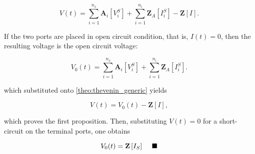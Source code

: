 \begin{equation} V(t) = \sum_{i=1}^{n_v} \mathbf{A}_i \left[V^S_i\right] + \sum_{i=1}^{n_i} \mathbf{Z}_A \left[I^S_i\right] - \mathbf{Z} \left[I\right] .\label{theo:thevenin_generic}\end{equation}

	If the two ports are placed in open circuit condition, that is, $I(t) = 0$, then the resulting voltage is the open circuit voltage:

\begin{equation} V_0(t) = \sum_{i=1}^{n_v} \mathbf{A}_i \left[V^S_i\right] + \sum_{i=1}^{n_i} \mathbf{Z}_A \left[I^S_i\right].\end{equation}

	\noindent which substituted onto \eqref{theo:thevenin_generic} yields

\begin{equation} V(t) = V_0(t) - \mathbf{Z} \left[I\right] ,\end{equation}

	which proves the first proposition. Then, substituting $V(t) = 0$ for a short-circuit on the terminal ports, one obtains

\begin{equation} V_0(t) = \mathbf{Z} \left[ I_S\right] \tag*{\llap{$\blacksquare$}} \end{equation} %


